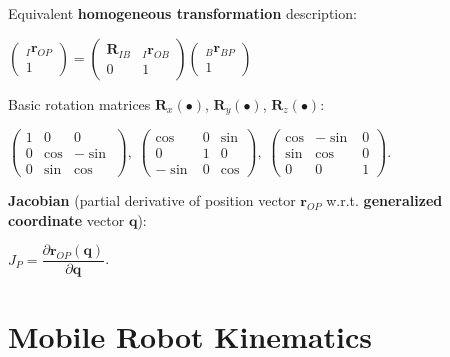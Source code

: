 \documentclass[8pt,landscape]{article}
\begin{document}
\begin{multicols}{3}
Equivalent \textbf{homogeneous transformation} description:

\vspace{-5pt}
\begin{center}
  $\left(\begin{matrix}
    {}_I\mathbf{r}_{OP} \\
    1
  \end{matrix}\right)
  =
  \left(\begin{matrix}
    \mathbf{R}_{IB} & {}_I\mathbf{r}_{OB} \\
    0 & 1
  \end{matrix}\right)
  \left(\begin{matrix}
    {}_B\mathbf{r}_{BP} \\
    1
  \end{matrix}\right)$
\end{center}

Basic rotation matrices $\mathbf R_x(\bullet)$, $\mathbf R_y(\bullet)$, $\mathbf
R_z(\bullet)$:

\vspace{-5pt}
\begin{center}
  $\left(\begin{matrix}
    1 & 0 & 0 \\
    0 & \cos & -\sin \\
    0 & \sin & \cos
  \end{matrix}\right),\;
  \left(\begin{matrix}
    \cos & 0 & \sin \\
    0 & 1 & 0 \\
    -\sin & 0 & \cos
  \end{matrix}\right),\;
  \left(\begin{matrix}
    \cos & -\sin & 0 \\
    \sin & \cos & 0 \\
    0 & 0 & 1
  \end{matrix}\right).$
\end{center}

\textbf{Jacobian} (partial derivative of position vector $\mathbf{r}_{OP}$
w.r.t. \textbf{generalized coordinate} vector $\mathbf{q}$):

\vspace{-5pt}
\begin{center}
  $J_P = \dfrac{\partial \mathbf{r}_{OP}(\mathbf q)}{\partial \mathbf q}$.
\end{center}

\section{Mobile Robot Kinematics}


\end{multicols}
\end{document}
